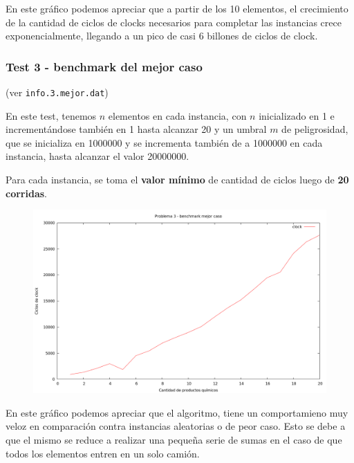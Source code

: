 \vspace*{0.5cm}

En este gráfico podemos apreciar que a partir de los 10 elementos, el
crecimiento de la cantidad de ciclos de clocks necesarios para completar las
instancias crece exponencialmente, llegando a un pico de casi 6 billones de
ciclos de clock.


\newpage
\subsubsection{Test 3 - benchmark del mejor caso}

(ver \verb|info.3.mejor.dat|) \medskip

En este test, tenemos $n$ elementos en cada instancia, con $n$ inicializado en 1 e incrementándose
también en 1 hasta alcanzar 20 y un umbral $m$ de peligrosidad, que se inicializa en 1000000 y se incrementa
también de a 1000000 en cada instancia, hasta alcanzar el valor 20000000.

Para cada instancia, se toma el \textbf{valor mínimo} de cantidad de ciclos luego de \textbf{20 corridas}.


\begin{figure}[h]
  \begin{center}
    \includegraphics[scale=0.35]{imagenes/grafico-3-mejor.png}
  \end{center}
\end{figure}


En este gráfico podemos apreciar que el algoritmo, tiene un comportamieno
muy veloz en comparación contra instancias aleatorias o de peor caso. Esto
se debe a que el mismo se reduce a realizar una pequeña serie de sumas en el
caso de que todos los elementos entren en un solo camión.
